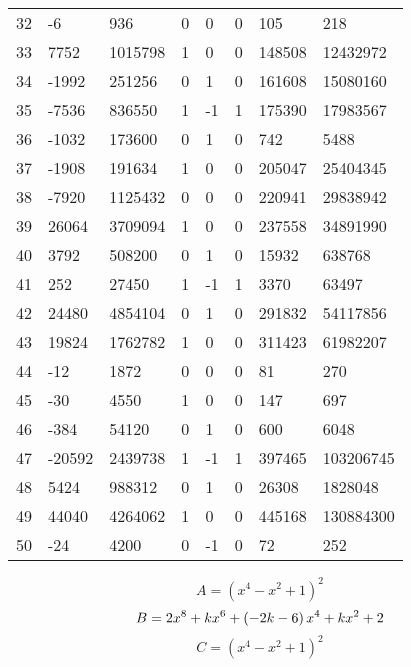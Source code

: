 \documentclass{amsart}
\begin{document}
\begin{longtable}{|l|l|l|lllll|}
32&-6&936&0&0&0&105&218\\
33&7752&1015798&1&0&0&148508&12432972\\
34&-1992&251256&0&1&0&161608&15080160\\
35&-7536&836550&1&-1&1&175390&17983567\\
36&-1032&173600&0&1&0&742&5488\\
37&-1908&191634&1&0&0&205047&25404345\\
38&-7920&1125432&0&0&0&220941&29838942\\
39&26064&3709094&1&0&0&237558&34891990\\
40&3792&508200&0&1&0&15932&638768\\
41&252&27450&1&-1&1&3370&63497\\
42&24480&4854104&0&1&0&291832&54117856\\
43&19824&1762782&1&0&0&311423&61982207\\
44&-12&1872&0&0&0&81&270\\
45&-30&4550&1&0&0&147&697\\
46&-384&54120&0&1&0&600&6048\\
47&-20592&2439738&1&-1&1&397465&103206745\\
48&5424&988312&0&1&0&26308&1828048\\
49&44040&4264062&1&0&0&445168&130884300\\
50&-24&4200&0&-1&0&72&252\\
\hline
\end{longtable}
$$A=(x^4
 - x^2
 + 1)^{2}$$
$$B=2\*x^8
 + k\*x^6
 + \left(-2\*k
 - 6\right) \*x^4
 + k\*x^2
 + 2$$
$$C=(x^4
 - x^2
 + 1)^{2}$$
\end{document}
